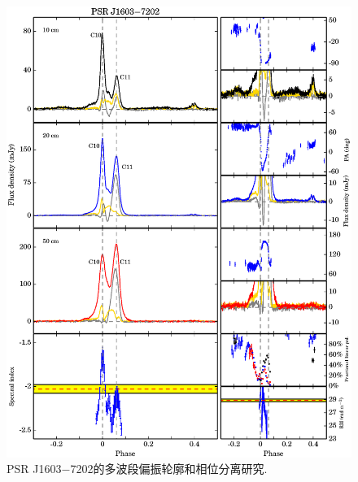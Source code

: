\begin{figure}
\begin{center}
\includegraphics[width=6 in]{1603.ps}
\caption{PSR J1603$-$7202的多波段偏振轮廓和相位分离研究.}
\label{1603}
\end{center}
\end{figure}

